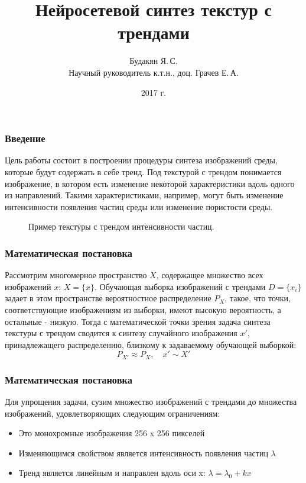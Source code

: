 \documentclass[12pt]{beamer}
\begin{document}
\title{Нейросетевой синтез текстур с трендами}
\author{Будакян Я.\,С. \\ Научный руководитель к.т.н., доц. Грачев Е.\,А.}
\date{2017 г.} 

\maketitle

\begin{frame}\frametitle{Введение}
	Цель работы состоит в построении процедуры синтеза изображений среды, которые будут содержать в себе тренд. Под текстурой с трендом понимается изображение, в котором есть изменение некоторой характеристики вдоль одного из направлений. Такими характеристиками, например, могут быть изменение интенсивности появления частиц среды или изменение пористости среды. \\
	\begin{figure}
		\caption{Пример текстуры с трендом интенсивности частиц.}
		\label{trend-example}
	\end{figure}
\end{frame}

\begin{frame}\frametitle{Математическая постановка}
	Рассмотрим многомерное пространство $X$, содержащее множество всех изображений $x$: $X = \{x\}$. Обучающая выборка изображений с трендами $D = \{x_i\}$ задает в этом пространстве вероятностное распределение $P_X$, такое, что точки, соответствующие изображениям из выборки, имеют высокую вероятность, а остальные - низкую. Тогда с математической точки зрения задача синтеза текстуры с трендом сводится к синтезу случайного изображения $x'$, принадлежащего распределению, близкому к задаваемому обучающей выборкой:
	$$ P_{X'} \approx P_X, \quad x' \sim X'$$
\end{frame}

\begin{frame}\frametitle{Математическая постановка}
	Для упрощения задачи, сузим множество изображений с трендами до множества изображений, удовлетворяющих следующим ограничениям:
	\begin{itemize}
		\item Это монохромные изображения 256 x 256 пикселей
		\item Изменяющимся свойством является интенсивность появления частиц $\lambda$
		\item Тренд является линейным и направлен вдоль оси x: 
		$ \lambda = \lambda_0 + kx $
	\end{itemize}
\end{frame}
\end{document}
